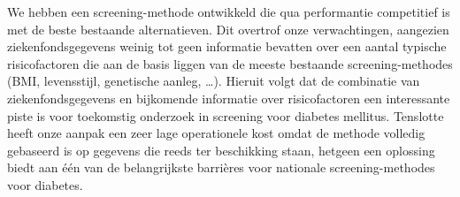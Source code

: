 We hebben een screening-methode ontwikkeld die qua performantie competitief is met de beste bestaande alternatieven. Dit overtrof onze verwachtingen, aangezien ziekenfondsgegevens weinig tot geen informatie bevatten over een aantal typische risicofactoren die aan de basis liggen van de meeste bestaande screening-methodes (BMI, levensstijl, genetische aanleg, \ldots). Hieruit volgt dat de combinatie van ziekenfondsgegevens en bijkomende informatie over risicofactoren een interessante piste is voor toekomstig onderzoek in screening voor diabetes mellitus. Tenslotte heeft onze aanpak een zeer lage operationele kost omdat de methode volledig gebaseerd is op gegevens die reeds ter beschikking staan, hetgeen een oplossing biedt aan \'e\'en van de belangrijkste barri\`eres voor nationale screening-methodes voor diabetes.



\cleardoublepage

